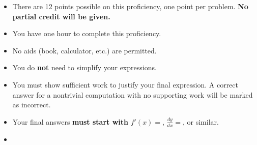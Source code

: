 \documentclass[12pt]{article}
\begin{document}
\begin{itemize}
\addtolength\itemsep{-1mm}
\item There are 12 points possible on this proficiency, one point per problem. {\bf No partial credit will be given.}

\item You have one hour to complete this proficiency.

\item No aids (book, calculator, etc.) are permitted.  

\item You do \textbf{not} need to simplify your expressions.

\item You must show sufficient work to justify your final expression. A correct answer for a nontrivial computation with no supporting work will be marked as incorrect.


\item Your final answers \textbf{must start with} $f'(x)=$, $\frac{dy}{dx}=$, or similar.

\item {\bf {}}
\end{itemize}
\end{document}
